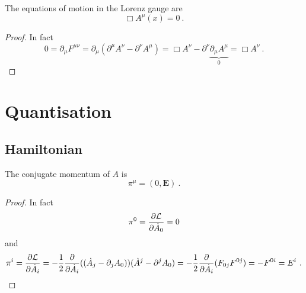     The equations of motion in the Lorenz gauge are 
    \begin{equation*}
        \Box A^\mu (x) = 0 ~.
    \end{equation*}
    \begin{proof}
        In fact 
        \begin{equation*}
            0 = \partial_\mu F^{\mu\nu} = \partial_\mu (\partial^\mu A^\nu - \partial^\nu A^\mu) = \Box A^\nu - \partial^\nu \underbrace{\partial_\mu A^\mu}_0 = \Box A^\nu ~.
        \end{equation*}
    \end{proof}

\chapter{Quantisation}

\section{Hamiltonian}

    The conjugate momentum of $A$ is 
    \begin{equation*}
        \pi^\mu = (0, \mathbf E) ~.
    \end{equation*}
    \begin{proof}
        In fact 
        \begin{equation*}
            \pi^0 = \frac{\partial\mathcal L}{\partial\dot A_0} = 0
        \end{equation*}
        and 
        \begin{equation*}
            \pi^i = \frac{\partial\mathcal L}{\partial\dot A_i} = - \frac{1}{2} \frac{\partial}{\partial\dot A_i} ((\dot A_j - \partial_j A_0))(\dot A^j - \partial^j A_0) = - \frac{1}{2} \frac{\partial}{\partial\dot A_i} (F_{0j} F^{0j}) = - F^{0i} = E^i ~.
        \end{equation*}
    \end{proof}

